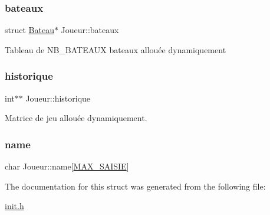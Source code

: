 \subsubsection{\texorpdfstring{bateaux}{bateaux}}
{\footnotesize\ttfamily struct \hyperlink{structBateau}{Bateau}$\ast$ Joueur\+::bateaux}

Tableau de N\+B\+\_\+\+B\+A\+T\+E\+A\+UX bateaux allouée dynamiquement \hypertarget{structJoueur_a592804f8ad7d125fabdf06bbbffd60c2}{}\label{structJoueur_a592804f8ad7d125fabdf06bbbffd60c2} 
\subsubsection{\texorpdfstring{historique}{historique}}
{\footnotesize\ttfamily int$\ast$$\ast$ Joueur\+::historique}

Matrice de jeu allouée dynamiquement. \hypertarget{structJoueur_ab612f3b383ec2463e302d1f8ba5fc4fd}{}\label{structJoueur_ab612f3b383ec2463e302d1f8ba5fc4fd} 
\subsubsection{\texorpdfstring{name}{name}}
{\footnotesize\ttfamily char Joueur\+::name\mbox{[}\hyperlink{init_8h_a2277af00d169389a0db61a0dbefa2e05}{M\+A\+X\+\_\+\+S\+A\+I\+S\+IE}\mbox{]}}



The documentation for this struct was generated from the following file\+:\begin{DoxyCompactItemize}
\item 
\hyperlink{init_8h}{init.\+h}\end{DoxyCompactItemize}
